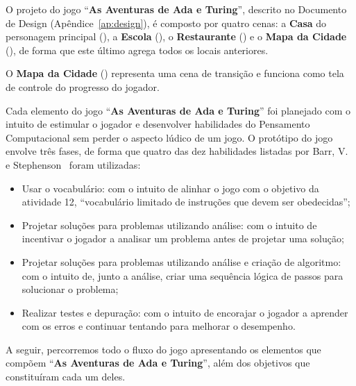 O projeto do jogo “\textbf{As Aventuras de Ada e Turing}”, descrito no Documento de Design (Apêndice~\ref{ap:design}), é composto por quatro cenas: a \textbf{Casa} do personagem principal (), a \textbf{Escola} (), o \textbf{Restaurante} () e o  \textbf{Mapa da Cidade} (), de forma que este último agrega todos os locais anteriores.

O  \textbf{Mapa da Cidade} () representa uma cena de transição e funciona como tela de controle do progresso do jogador.





Cada elemento do jogo “\textbf{As Aventuras de Ada e Turing}” foi planejado com o intuito de estimular o jogador e desenvolver habilidades do Pensamento Computacional sem perder o aspecto lúdico de um jogo. O protótipo do jogo envolve três fases, de forma que quatro das dez habilidades listadas por Barr, V. e Stephenson~\cite{barr_bringing_2011} foram utilizadas:

\begin{itemize}
	\item Usar o vocabulário: com o intuito de alinhar o jogo com o objetivo da atividade 12, “vocabulário limitado de instruções que devem ser obedecidas”;
	\item Projetar soluções para problemas utilizando análise: com o intuito de incentivar o jogador a analisar um problema antes de projetar uma solução;
	\item Projetar soluções para problemas utilizando análise e criação de algoritmo: com o intuito de, junto a análise, criar uma sequência lógica de passos para solucionar o problema;
	\item Realizar testes e depuração: com o intuito de encorajar o jogador a aprender com os erros e continuar tentando para melhorar o desempenho.
\end{itemize}

A seguir, percorremos todo o fluxo do jogo apresentando os elementos que compõem “\textbf{As Aventuras de Ada e Turing}”, além dos objetivos que constituíram cada um deles.

